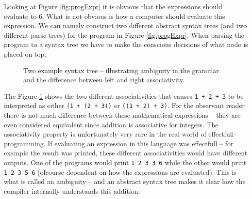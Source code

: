 Looking at Figure \ref{fig:progExpr} it is obvious that the expressions should evaluate to 6. What is not obvious is how a computer should evaluate this expression. We can namely construct two different abstract syntax trees (and two different parse trees) for the program in Figure  \ref{fig:progExpr}. When parsing the program to a syntax tree we have to make the conscious decisions of what node is placed on top.


\begin{figure}
\centering
\begin{subfigure}{.5\textwidth}
\centering
{}
\end{subfigure}%
\begin{subfigure}{.5\textwidth}
\centering
{}
\end{subfigure}
  \caption{Two example syntax tree -- illustrating ambiguity in the grammar and the difference between left and right associativity.}
  \label{fig:astExpr}
\end{figure}

The Figure \ref{fig:astExpr} shows the two different associativities that causes \verb!1 + 2 + 3! to be interpreted as either \verb!(1 + (2 + 3))! or \verb!((1 + 2) + 3)!. For the observant reader there is not much difference between these mathematical expressions -- they are even considered equivalent since addition is associative for integers. The associativity property is unfortunately very rare in the real world of effectfull-programming. If evaluating an expression in this language was effectfull -- for example the result was printed, these different associativities would have different outputs. One of the programs would print \verb+1 2 3 3 6+ while the other would print \verb+1 2 3 5 6+ (ofcourse dependent on how the expressions are evaluated). This is what is called an ambiguity -- and an abstract syntax tree makes it clear how the compiler internally understands this addition.

